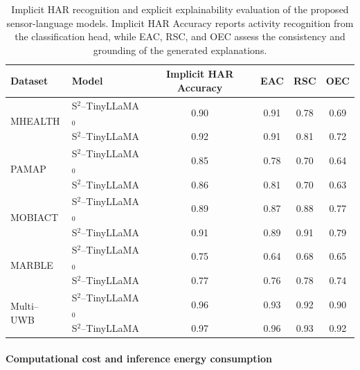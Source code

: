 \documentclass[preprint,12pt]{elsarticle}
\begin{document}
\begin{table}[t]
\centering
\caption{Implicit HAR recognition and explicit explainability evaluation of the proposed sensor-language models. Implicit HAR Accuracy reports activity recognition from the classification head, while EAC, RSC, and OEC assess the consistency and grounding of the generated explanations.}
\label{tab:explicit_explainability}

\scriptsize
\setlength{\tabcolsep}{5pt}
\renewcommand{\arraystretch}{1.05}

\begin{tabular}{l l c c c c}
\hline
Dataset & Model & Implicit HAR Accuracy & EAC & RSC & OEC \\
\hline

\multirow{2}{*}{MHEALTH}
& S$^{2}$--TinyLLaMA$_0$ & 0.90 & 0.91 & 0.78 & 0.69 \\
& S$^{2}$--TinyLLaMA & 0.92 & 0.91 & 0.81 & 0.72 \\
\hline

\multirow{2}{*}{PAMAP}
& S$^{2}$--TinyLLaMA$_0$ & 0.85 & 0.78 & 0.70 & 0.64 \\
& S$^{2}$--TinyLLaMA & 0.86 & 0.81 & 0.70 & 0.63 \\
\hline

\multirow{2}{*}{MOBIACT}
& S$^{2}$--TinyLLaMA$_0$ & 0.89 & 0.87 & 0.88 & 0.77 \\
& S$^{2}$--TinyLLaMA & 0.91 & 0.89 & 0.91 & 0.79 \\
\hline

\multirow{2}{*}{MARBLE}
& S$^{2}$--TinyLLaMA$_0$ & 0.75 & 0.64 & 0.68 & 0.65 \\
& S$^{2}$--TinyLLaMA & 0.77 & 0.76 & 0.78 & 0.74 \\
\hline

\multirow{2}{*}{Multi--UWB}
& S$^{2}$--TinyLLaMA$_0$ & 0.96 & 0.93 & 0.92 & 0.90 \\
& S$^{2}$--TinyLLaMA & 0.97 & 0.96 & 0.93 & 0.92 \\
\hline

\end{tabular}
\end{table}




\paragraph{Computational cost and inference energy consumption}
\end{document}
